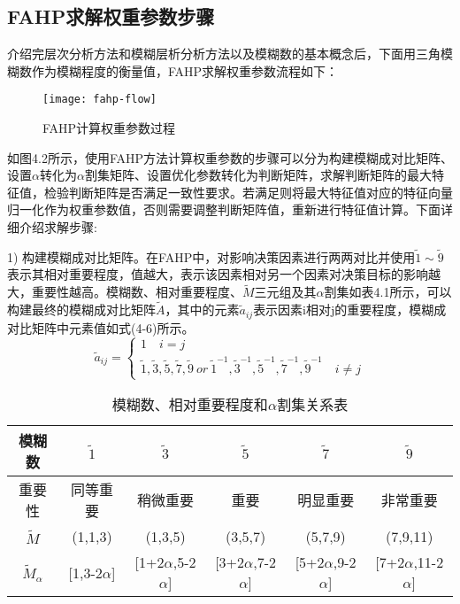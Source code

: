 \subsection{FAHP求解权重参数步骤}
介绍完层次分析方法和模糊层析分析方法以及模糊数的基本概念后，下面用三角模糊数作为模糊程度的衡量值，FAHP求解权重参数流程如下：
\begin{figure}[H] %
	\centering
	\texttt{[image: fahp-flow]}
	\caption{FAHP计算权重参数过程}
\end{figure}
如图4.2所示，使用FAHP方法计算权重参数的步骤可以分为构建模糊成对比矩阵、设置$\alpha$转化为$\alpha$割集矩阵、设置优化参数转化为判断矩阵，求解判断矩阵的最大特征值，检验判断矩阵是否满足一致性要求。若满足则将最大特征值对应的特征向量归一化作为权重参数值，否则需要调整判断矩阵值，重新进行特征值计算。下面详细介绍求解步骤:

1) 构建模糊成对比矩阵。在FAHP中，对影响决策因素进行两两对比并使用$\widetilde{1}\sim \widetilde{9}$表示其相对重要程度，值越大，表示该因素相对另一个因素对决策目标的影响越大，重要性越高。模糊数、相对重要程度、$\widetilde{M}$三元组及其$\alpha$割集如表4.1所示，可以构建最终的模糊成对比矩阵$\widetilde{A} $，其中的元素$\widetilde{a}_{ij} $表示因素i相对j的重要程度，模糊成对比矩阵中元素值如式(4-6)所示。
\begin{equation}
\widetilde{a}_{ij} = \left\{\begin{array}{l}
1 \quad i=j \\ [0.2cm]
\widetilde{1},\widetilde{3},\widetilde{5},\widetilde{7},\widetilde{9}\ or\ \widetilde{1}^{-1},\widetilde{3}^{-1},\widetilde{5}^{-1},\widetilde{7}^{-1},\widetilde{9}^{-1} \quad i\not=j  
\end{array}\right.
\end{equation}
\begin{table}[htbp]
	\centering\dawu[1.3]
	\caption{模糊数、相对重要程度和$\alpha$割集关系表}
	\begin{tabular}{|c|c|c|c|c|c|} \hline
		模糊数 & $\widetilde{1}$ & $\widetilde{3}$ & $\widetilde{5}$  & $\widetilde{7}$ & $\widetilde{9}$ \\ \hline
		重要性 & 同等重要 & 稍微重要 & 重要 & 明显重要 & 非常重要 \\ \hline 
		$\widetilde{M}$ & (1,1,3) & (1,3,5) & (3,5,7) & (5,7,9) & (7,9,11) \\ \hline 
		$\widetilde{M}_{\alpha}$ & [1,3-2$\alpha$] & [1+2$\alpha$,5-2$\alpha$] & [3+2$\alpha$,7-2$\alpha$] & [5+2$\alpha$,9-2$\alpha$] & [7+2$\alpha$,11-2$\alpha$]\\ \hline 
	\end{tabular}
\end{table}

